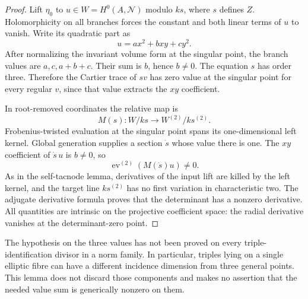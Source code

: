 \begin{proof}
Lift $\eta_0$ to $u\in W=H^0(A,\mathcal N)$ modulo $ks$, where
$s$ defines $Z$. Holomorphicity on all branches forces the
constant and both linear terms of $u$ to vanish. Write its
quadratic part as
\[
                          u=a x^2+bxy+c y^2.
\]
After normalizing the invariant volume form at the singular point,
the branch values are $a,c,a+b+c$. Their sum is $b$, hence $b\ne0$.
The equation $s$ has order three. Therefore the Cartier trace of
$sv$ has zero value at the singular point for every regular $v$,
since that value extracts the $xy$ coefficient.

In root-removed coordinates the relative map is
\[
                  M(s):W/ks\longrightarrow W^{(2)}/ks^{(2)}.
\]
Frobenius-twisted evaluation at the singular point spans its
one-dimensional left kernel. Global generation supplies a
section $\dot s$ whose value there is one. The $xy$ coefficient
of $\dot s\,u$ is $b\ne0$, so
\[
                \operatorname{ev}^{(2)}(M(\dot s)u)\ne0.
\]
As in the self-tacnode lemma, derivatives of the input lift are
killed by the left kernel, and the target line $ks^{(2)}$ has no
first variation in characteristic two. The adjugate derivative
formula proves that the determinant has a nonzero derivative.
All quantities are intrinsic on the projective coefficient space:
the radial derivative vanishes at the determinant-zero point.
\end{proof}

\begin{remark}\label{auto:A_monodromy:9292c61fd3ca}

The hypothesis on the three values has not been proved on every
triple-identification divisor in a norm family. In particular,
triples lying on a single elliptic fibre can have a different
incidence dimension from three general points. This lemma does
not discard those components and makes no assertion that the
needed value sum is generically nonzero on them.
\end{remark}

